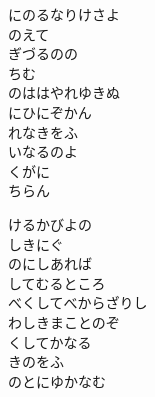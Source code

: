 \documentclass[10pt,b5j]{tarticle} %
\begin{document}
\vspace{1.5em} %
\newcommand{\linespace}{0.5em} %
\newcommand{\blocksize}{0.5\hsize} %
\begin{enumerate} %
    \begin{minipage}[c]{\blocksize}
    
        \vspace{\linespace}
        \item
        にのるなりけさよ\\
        のえて\\
        ぎづるのの\\
        ちむ\\
        のははやれゆきぬ\\
        にひにぞかん\\
        れなきをふ\\
        いなるのよ\\
        くがに\\
        ちらん
        
        \vspace{\linespace}
        \item
        けるかびよの\\
        しきにぐ\\
        のにしあれば\\
        してむるところ\\
        べくしてべからざりし\\
        わしきまことのぞ\\
        くしてかなる\\
        きのをふ\\
        のとにゆかなむ
        

\end{minipage}
\end{enumerate}
\end{document}
